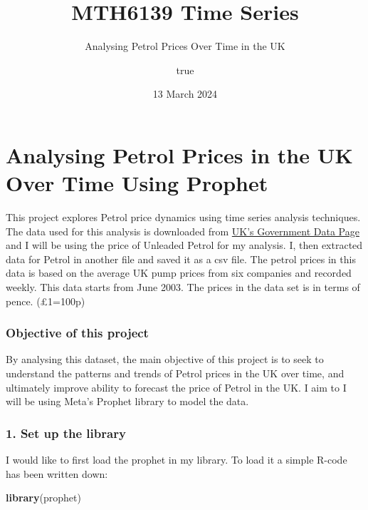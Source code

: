 \documentclass[
]{article}
\title{MTH6139 Time Series}
\subtitle{Analysing Petrol Prices Over Time in the UK}
\author{true}
\date{13 March 2024}
\newenvironment{Shaded}{\begin{snugshade}}{\end{snugshade}}
\newcommand{\FunctionTok}[1]{\textcolor[rgb]{0.13,0.29,0.53}{\textbf{#1}}}
\newcommand{\NormalTok}[1]{#1}
\begin{document}
\maketitle

{
\setcounter{tocdepth}{2}
\tableofcontents
}
\hypertarget{analysing-petrol-prices-in-the-uk-over-time-using-prophet}{%
\section{Analysing Petrol Prices in the UK Over Time Using
Prophet}\label{analysing-petrol-prices-in-the-uk-over-time-using-prophet}}

This project explores Petrol price dynamics using time series analysis
techniques. The data used for this analysis is downloaded from
\href{https://www.gov.uk/government/statistics/weekly-road-fuel-prices}{UK's
Government Data Page} and I will be using the price of Unleaded Petrol
for my analysis. I, then extracted data for Petrol in another file and
saved it as a csv file. The petrol prices in this data is based on the
average UK pump prices from six companies and recorded weekly. This data
starts from June 2003. The prices in the data set is in terms of pence.
(£1=100p)

\hypertarget{objective-of-this-project}{%
\subsubsection{Objective of this
project}\label{objective-of-this-project}}

By analysing this dataset, the main objective of this project is to seek
to understand the patterns and trends of Petrol prices in the UK over
time, and ultimately improve ability to forecast the price of Petrol in
the UK. I aim to I will be using Meta's Prophet library to model the
data.

\hypertarget{set-up-the-library}{%
\subsubsection{1. Set up the library}\label{set-up-the-library}}

I would like to first load the prophet in my library. To load it a
simple R-code has been written down:

\begin{Shaded}
\begin{Highlighting}[]
\FunctionTok{library}\NormalTok{(prophet)}
\end{Highlighting}
\end{Shaded}
\end{document}
